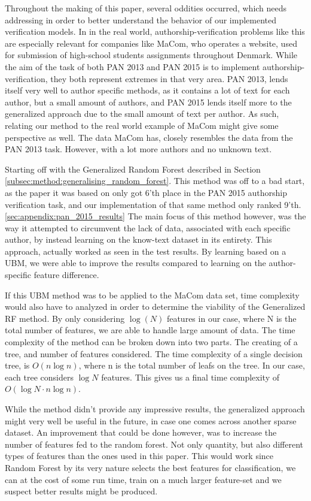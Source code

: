 Throughout the making of this paper, several oddities occurred, which needs
addressing in order to better understand the behavior of our implemented
verification models. In in the real world, authorship-verification problems
like this are especially relevant for companies like MaCom, who operates a
website, used for submission of high-school students assignments throughout
Denmark. While the aim of the task of both PAN 2013 and PAN 2015 is to implement
authorship-verification, they both represent extremes in that very area. PAN
2013, lends itself very well to author specific methods, as it contains a lot of
text for each author, but a small amount of authors, and PAN 2015 lends itself
more to the generalized approach due to the small amount of text per author. As
such, relating our method to the real world example of MaCom might give some
perspective as well. The data MaCom has, closely resembles the data from the PAN
2013 task. However, with a lot more authors and no unknown text.

Starting off with the Generalized Random Forest described in Section
\ref{subsec:method:generalising_random_forest}. This method was off to a bad
start, as the paper it was based on \cite{pacheco2015} only got 6'th place in
the PAN 2015 authorship verification task, and our implementation of that same
method only ranked 9'th. \ref{sec:appendix:pan_2015_results} The main focus of
this method however, was the way it attempted to circumvent the lack of data,
associated with each specific author, by instead learning on the know-text
dataset in its entirety. This approach, actually worked as seen in the test
results. By learning based on a \gls{UBM}, we were able to improve the results
compared to learning on the author-specific feature difference.

If this \gls{UBM} method was to be applied to the MaCom data set, time
complexity would also have to analyzed in order to determine the viability of
the Generalized RF method. By only considering $\log(N)$ features in our case,
where N is the total number of features, we are able to handle large amount of
data. The time complexity of the method can be broken down into two parts. The
creating of a tree, and number of features considered. The time complexity of a
single decision tree, is $O(n \log{n})$, where n is the total number of leafs on
the tree. In our case, each tree considers $\log{N}$ features. This gives us a
final time complexity of $O(\log{N} \cdot n \log{n})$.\cite{RFTime}

While the method didn't provide any impressive results, the generalized approach
might very well be useful in the future, in case one comes across another
sparse dataset. An improvement that could be done however, was to increase
the number of features fed to the random forest. Not only quantity, but also
different types of features than the ones used in this paper. This would
work since Random Forest by its very nature selects the best features for
classification, we can at the cost of some run time, train on a much larger
feature-set and we suspect better results might be produced.

